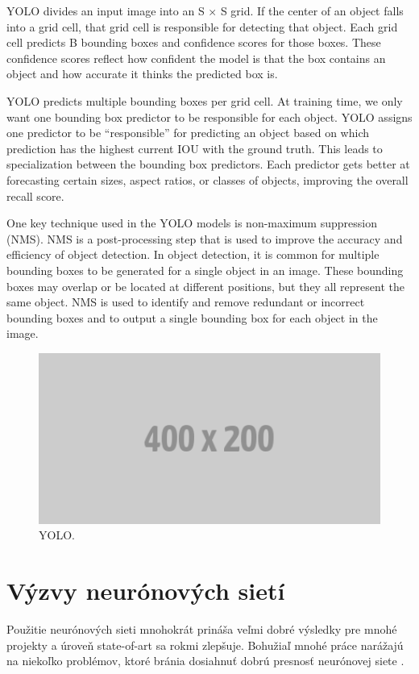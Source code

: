 YOLO divides an input image into an S × S grid. If the center of an object falls into a grid cell, that grid cell is responsible for detecting that object. Each grid cell predicts B bounding boxes and confidence scores for those boxes. These confidence scores reflect how confident the model is that the box contains an object and how accurate it thinks the predicted box is.

YOLO predicts multiple bounding boxes per grid cell. At training time, we only want one bounding box predictor to be responsible for each object. YOLO assigns one predictor to be “responsible” for predicting an object based on which prediction has the highest current IOU with the ground truth. This leads to specialization between the bounding box predictors. Each predictor gets better at forecasting certain sizes, aspect ratios, or classes of objects, improving the overall recall score.

One key technique used in the YOLO models is non-maximum suppression (NMS). NMS is a post-processing step that is used to improve the accuracy and efficiency of object detection. In object detection, it is common for multiple bounding boxes to be generated for a single object in an image. These bounding boxes may overlap or be located at different positions, but they all represent the same object. NMS is used to identify and remove redundant or incorrect bounding boxes and to output a single bounding box for each object in the image.

\begin{figure}[ht]
    \centering
    \includegraphics[width=1\textwidth]{images/placeholder.png}
    \caption{YOLO.}
    \label{img:ch2}
\end{figure}

\section{Výzvy neurónových sietí}
Použitie neurónových sieti mnohokrát prináša veľmi dobré výsledky pre mnohé projekty a úroveň state-of-art sa rokmi zlepšuje. Bohužiaľ mnohé práce narážajú na niekoľko problémov, ktoré bránia dosiahnuť dobrú presnosť neurónovej siete \cite{RosinPaulL2019RIAa}.

